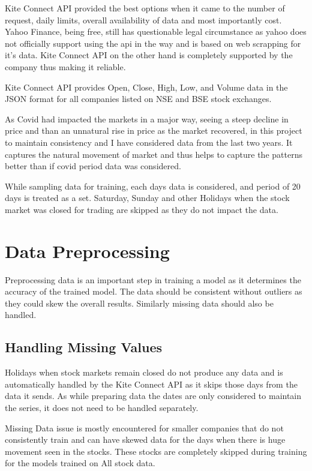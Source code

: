 Kite Connect API provided the  best options when it came to the number of request, daily limits, overall availability of data and most importantly cost. Yahoo Finance, being free, still has questionable legal circumstance as yahoo does not officially support using the api in the way and is based on web scrapping for it's data. Kite Connect API on the other hand is completely supported by the company thus making it reliable.

Kite Connect API provides Open, Close, High, Low, and Volume data in the JSON format for all companies listed on NSE and BSE stock exchanges.

As Covid had impacted the markets in a major way, seeing a steep decline in price and than an unnatural rise in price as the market recovered, in this project to maintain consistency and I have considered data from the last two years. It captures the natural movement of market and thus helps to capture the patterns better than if covid period data was considered.

While sampling data for training, each days data is considered, and period of 20 days is treated as a set. Saturday, Sunday and other Holidays when the stock market was closed for trading are skipped as they do not impact the data.

\section{Data Preprocessing}

Preprocessing data is an important step in training a model as it determines the accuracy of the trained model. The data should be consistent without outliers as they could skew the overall results. Similarly missing data should also be handled.

\subsection{Handling Missing Values}

Holidays when stock markets remain closed do not produce any data and is automatically handled by the Kite Connect API as it skips those days from the data it sends. As while preparing data the dates are only considered to maintain the series, it does not need to be handled separately.

Missing Data issue is mostly encountered for smaller companies that do not consistently train and can have skewed data for the days when there is huge movement seen in the stocks. These stocks are completely skipped during training for the models trained on All stock data.


